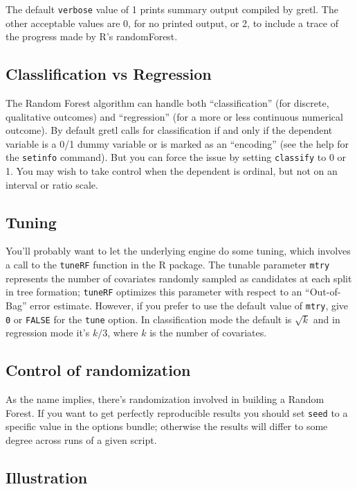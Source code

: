\documentclass{article}
\begin{document}
The default \texttt{verbose} value of 1 prints summary output compiled
by gretl. The other acceptable values are 0, for no printed output, or
2, to include a trace of the progress made by \textsf{R}'s
\textsf{randomForest}.

\subsection{Classlification vs Regression}

The Random Forest algorithm can handle both ``classification'' (for
discrete, qualitative outcomes) and ``regression'' (for a more or less
continuous numerical outcome). By default gretl calls for
classification if and only if the dependent variable is a 0/1 dummy
variable or is marked as an ``encoding'' (see the help for the
\texttt{setinfo} command).  But you can force the issue by setting
\texttt{classify} to 0 or 1. You may wish to take control when the
dependent is ordinal, but not on an interval or ratio scale.

\subsection{Tuning}

You'll probably want to let the underlying engine do some tuning,
which involves a call to the \texttt{tuneRF} function in the
\textsf{R} package. The tunable parameter \texttt{mtry} represents the
number of covariates randomly sampled as candidates at each split in
tree formation; \texttt{tuneRF} optimizes this parameter with respect
to an ``Out-of-Bag'' error estimate.  However, if you prefer to use
the default value of \texttt{mtry}, give \texttt{0} or \texttt{FALSE}
for the \texttt{tune} option. In classification mode the default is
$\sqrt{k}$ and in regression mode it's $k/3$, where $k$ is the number
of covariates.

\subsection{Control of randomization}

As the name implies, there's randomization involved in building a
Random Forest. If you want to get perfectly reproducible results you
should set \texttt{seed} to a specific value in the options bundle;
otherwise the results will differ to some degree across runs of a
given script.

\subsection{Illustration}
\end{document}
